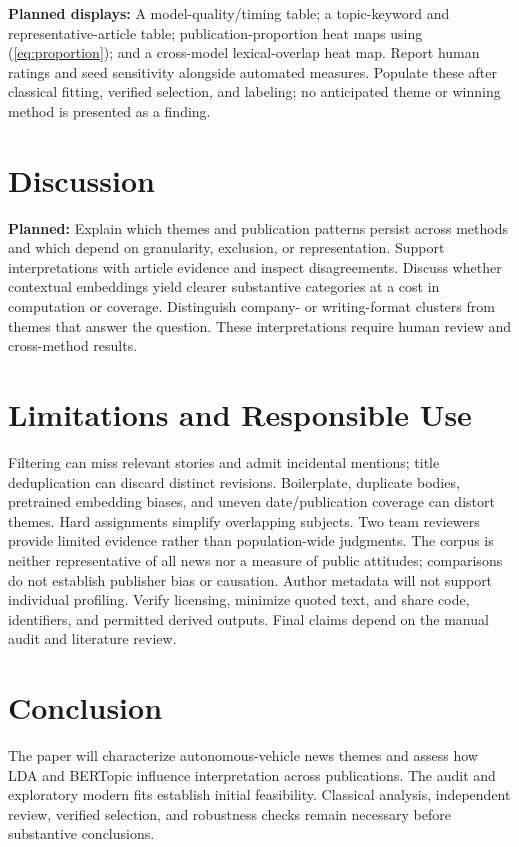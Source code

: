 \documentclass[conference]{IEEEtran}
\begin{document}
\textbf{Planned displays:} A model-quality/timing table; a topic-keyword and representative-article table; publication-proportion heat maps using (\ref{eq:proportion}); and a cross-model lexical-overlap heat map. Report human ratings and seed sensitivity alongside automated measures. Populate these after classical fitting, verified selection, and labeling; no anticipated theme or winning method is presented as a finding.

\section{Discussion}
\textbf{Planned:} Explain which themes and publication patterns persist across methods and which depend on granularity, exclusion, or representation. Support interpretations with article evidence and inspect disagreements. Discuss whether contextual embeddings yield clearer substantive categories at a cost in computation or coverage. Distinguish company- or writing-format clusters from themes that answer the question. These interpretations require human review and cross-method results.

\section{Limitations and Responsible Use}
Filtering can miss relevant stories and admit incidental mentions; title deduplication can discard distinct revisions. Boilerplate, duplicate bodies, pretrained embedding biases, and uneven date/publication coverage can distort themes. Hard assignments simplify overlapping subjects. Two team reviewers provide limited evidence rather than population-wide judgments. The corpus is neither representative of all news nor a measure of public attitudes; comparisons do not establish publisher bias or causation. Author metadata will not support individual profiling. Verify licensing, minimize quoted text, and share code, identifiers, and permitted derived outputs. Final claims depend on the manual audit and literature review.

\section{Conclusion}
The paper will characterize autonomous-vehicle news themes and assess how LDA and BERTopic influence interpretation across publications. The audit and exploratory modern fits establish initial feasibility. Classical analysis, independent review, verified selection, and robustness checks remain necessary before substantive conclusions.
\end{document}
